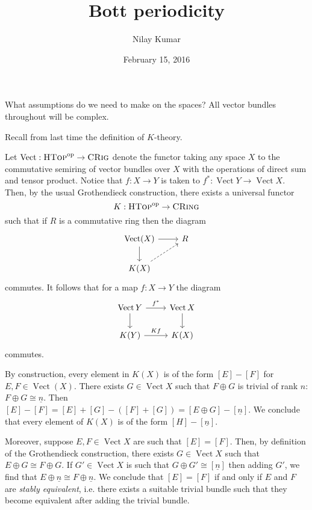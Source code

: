 \documentclass{amsart}
\title{Bott periodicity}
\author{Nilay Kumar}
\date{February 15, 2016}
\DeclareMathOperator{\Vect}{Vect}
\begin{document}
\maketitle

{\color{red} What assumptions do we need to make on the spaces?}
All vector bundles throughout will be complex.

Recall from last time the definition of $K$-theory.
\begin{definition}
    Let $\Vect:\textsc{HTop}^\text{op}\to\textsc{CRig}$ denote the functor taking any space $X$ to the commutative semiring
    of vector bundles over $X$ with the operations of direct sum and tensor product. Notice that $f:X\to Y$ is taken to
    $f^*:\Vect Y\to\Vect X$. Then, by the usual Grothendieck construction,  there exists a universal functor
    \begin{equation*}
        K:\textsc{HTop}^\text{op}\to\textsc{CRing}
    \end{equation*}
    such that if $R$ is a commutative ring then the diagram
    \begin{equation*}
        \begin{tikzcd}
            \Vect(X)\rar\dar & R\\
            K(X)\urar[dashed]
        \end{tikzcd}
    \end{equation*}
    commutes. It follows that for a map $f:X\to Y$ the diagram
    \begin{equation*}
        \begin{tikzcd}
            \Vect Y\rar{f^*}\dar & \Vect X\dar\\
            K(Y) \rar{Kf} & K(X)
        \end{tikzcd}
    \end{equation*}
    commutes.
\end{definition}

\begin{remark}
    By construction, every element in $K(X)$ is of the form $[E]-[F]$ for $E,F\in\Vect(X)$.
    There exists $G\in\Vect X$ such that $F\oplus G$ is trivial of rank $n$: $F\oplus G\cong\underline{n}$.
    Then $[E]-[F]=[E]+[G]-([F]+[G])=[E\oplus G]-[\underline{n}]$. We conclude that every element
    of $K(X)$ is of the form $[H]-[\underline{n}]$.

    Moreover, suppose $E,F\in\Vect X$ are such that $[E]=[F]$. Then, by definition of the Grothendieck
    construction, there exists $G\in\Vect X$ such that $E\oplus G\cong F\oplus G$. If $G'\in\Vect X$
    is such that $G\oplus G'\cong[\underline{n}]$ then adding $G'$, we find that $E\oplus\underline{n}\cong F\oplus\underline{n}$.
    We conclude that $[E]=[F]$ if and only if $E$ and $F$ are \textit{stably equivalent}, i.e. there exists
    a suitable trivial bundle such that they become equivalent after adding the trivial bundle.
\end{remark}
\end{document}
